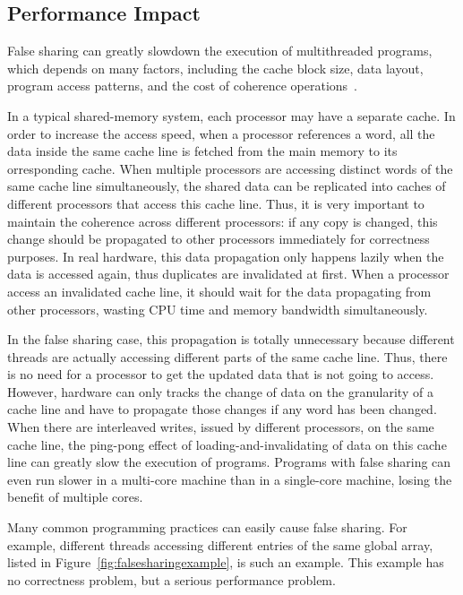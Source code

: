 \subsection{Performance Impact}
\label{falsesharing}
False sharing can greatly slowdown the execution of multithreaded programs, which depends on many factors, including the cache block size, data layout, program access patterns, and the cost of coherence operations~\cite{Bolosky:1993:FSE:1295480.1295483}. 

In a typical shared-memory system, each processor may have a separate cache. In order to increase the access speed, when a processor references a word, all the data inside the same cache line is fetched from the main memory to its orresponding cache. 
When multiple processors are accessing distinct words of the same cache line simultaneously, the shared data can be replicated into caches of different processors that access this cache line. Thus, it is very important to maintain the coherence across different processors: if any copy is changed, this change should be propagated to other processors immediately for correctness purposes. In real hardware, this data propagation only happens lazily when the data is accessed again, thus duplicates are invalidated at first. When a processor access an invalidated cache line, it should wait for the data propagating from other processors, wasting CPU time and memory bandwidth simultaneously. 

In the false sharing case, this propagation is totally unnecessary because different threads are actually accessing different parts of the same cache line. Thus, there is no need for a processor to get the updated data that is not going to access. However, hardware can only tracks the change of data on the granularity of a cache line and have to propagate those changes if any word has been changed. When there are interleaved writes, issued by different processors, on the same cache line, the ping-pong effect of loading-and-invalidating of data on this cache line can greatly slow the execution of programs. 
Programs with false sharing can even run slower in a multi-core machine than in a single-core machine, losing the benefit of multiple cores.  

Many common programming practices can easily cause false sharing. For example, different threads accessing different entries of the same global array, listed in Figure~\ref{fig:falsesharingexample}, is such an example. This example has no correctness problem, but a serious performance problem. 

